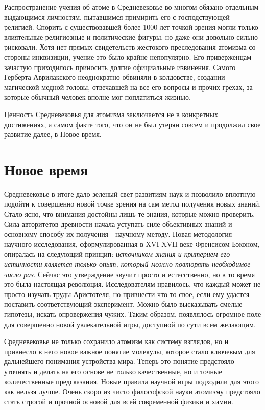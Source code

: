 Распространение учения об атоме в Средневековье во многом обязано отдельным выдающимся личностям, пытавшимся примирить его с господствующей религией.
Спорить с существовавшей более 1000 лет точкой зрения могли только влиятельные религиозные и политические фигуры, но даже они довольно сильно рисковали.
Хотя нет прямых свидетельств жестокого преследования атомизма со стороны инквизиции, учение это было крайне непопулярно.
Его приверженцам зачастую приходилось приносить долгие официальные извинения.
Самого Герберта Аврилакского неоднократно обвиняли в колдовстве, создании магической медной головы, отвечавшей на все его вопросы и прочих грехах, за которые обычный человек вполне мог поплатиться жизнью.

Ценность Средневековья для атомизма заключается не в конкретных достижениях, а самом факте того, что он не был утерян совсем и продолжил свое развитие далее, в Новое время.


\section*{Новое время}

Средневековье в итоге дало зеленый свет развитиям наук и позволило вплотную подойти к совершенно новой точке зрения на сам метод получения новых знаний.
Стало ясно, что внимания достойны лишь те знания, которые можно проверить.
Сила авторитетов древности начала уступать силе объективных знаний и основному способу их получения - научному методу.
Новая методология научного исследования, сформулированная в XVI-XVII веке Френсисом Бэконом, опиралась на следующий принцип: \textit{источником знания и критерием его истинности является только опыт, который можно повторять необходимое число раз}.
Сейчас это утверждение звучит просто и естесственно, но в то время это была настоящая революция.
Исследователям нравилось, что каждый может не просто изучать труды Аристотеля, но привнести что-то свое, если ему удастся поставить соответствующий эксперимент.
Можно было высказывать смелые гипотезы, искать опровержения чужих.
Таким образом, появлялось огромное поле для совершенно новой увлекательной игры, доступной по сути всем желающим.

Средневековье не только сохранило атомизм как систему взглядов, но и привнесло в него новое важное понятие молекулы, которое стало ключевым для дальнейшего понимания устройства мира. 
Теперь это понятие предстояло уточнять и делать на его основе не только качественные, но и точные количественные предсказания.
Новые правила научной игры подходили для этого как нельзя лучше.
Очень скоро из чисто философской науки атомизму предстояло стать строгой и прочной основой для всей современной физики и химии.

